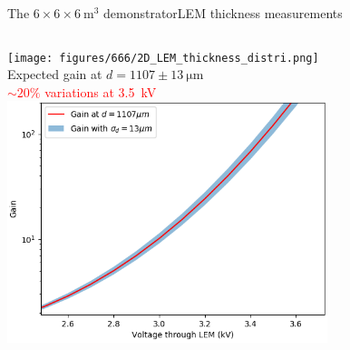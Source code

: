\documentclass[10pt]{beamer}
\begin{document}
\begin{frame}{The \texorpdfstring{$6 \times 6 \times \SI{6}{\meter\cubed}$}{666} demonstrator}{LEM thickness measurements}
\begin{scriptsize}
\begin{columns}
\begin{column}{0.48\textwidth}
    				\texttt{[image: figures/666/2D\_LEM\_thickness\_distri.png]}\\
    				\vfill
    				\centering
    				Expected gain at $d=1107\pm\SI{13}{\micro\meter}$\\
    				\textcolor{red}{$\sim 20\%$ variations at \SI{3.5}{\kilo\volt}}\\
    				\includegraphics[width=0.7\textwidth]{figures/666/measured_gain_fluctuations.png}
    			\end{column}
    		\end{columns}
    	\end{scriptsize}
    \end{frame}
    
\end{document}
